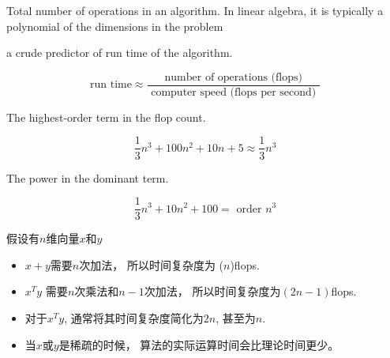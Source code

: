\begin{definition}
    Total number of operations in an algorithm. In linear algebra, it is typically a polynomial of the dimensions in the problem

\end{definition}
\begin{theorem}[通过浮点运算次数大致预测程序的运行时间]
    a crude predictor of run time of the algorithm.

    \begin{equation}\text{run time}  \approx \frac{\text { number of operations (flops) }}{\text { computer speed (flops per second) }} \end{equation}
\end{theorem}

\begin{definition}
    The highest-order term in the flop count.

\end{definition}

\begin{example}
    \begin{equation}
\frac{1}{3} n^{3}+100 n^{2}+10 n+5 \approx \frac{1}{3} n^{3}
\end{equation}
\end{example}

\begin{definition}[Order]
    The power in the dominant term.
\end{definition}

\begin{example}
    \begin{equation}
\frac{1}{3} n^{3}+10 n^{2}+100=\text { order } n^{3}
\end{equation}
\end{example}


\begin{corollary}
    假设有$n$维向量$x$和$y$

    \begin{itemize}
        \item $x+y$需要$n$次加法， 所以时间复杂度为 ($n$)flops. 
        \item $x^T y$ 需要$n$次乘法和$n - 1$次加法， 所以时间复杂度为$(2n - 1)$flops. 
        \item 对于$x^T y$, 通常将其时间复杂度简化为$2n$, 甚至为$n$. 
        \item 当$x$或$y$是稀疏的时候， 算法的实际运算时间会比理论时间更少。 
    \end{itemize}
\end{corollary}


